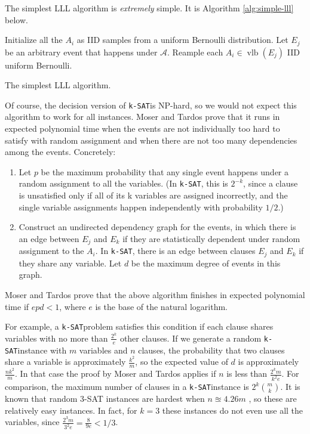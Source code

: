 \documentclass{article}
\newcommand{\ksat}{\texttt{k-SAT}}
\begin{document}
The simplest LLL algorithm is \emph{extremely} simple.  It is Algorithm \ref{alg:simple-lll} below.

\begin{algorithm}[H]
\label{alg:simple-lll}
\begin{algorithmic}
\State Initialize all the $A_i$ as IID samples from a uniform Bernoulli distribution.
  \State Let $E_j$ be an arbitrary event that happens under $\mathcal{A}$.
  \State Reample each $A_i \in \operatorname{vlb}(E_j)$ IID uniform Bernoulli.
\EndWhile
\end{algorithmic}
\caption{The simplest LLL algorithm.}
\end{algorithm}

Of course, the decision version of \ksat is NP-hard, so we would not expect this algorithm to work for all instances.  Moser and Tardos \cite{moser2010constructive} prove that it runs in expected polynomial time when the events are not individually too hard to satisfy with random assignment and when there are not too many dependencies among the events.  Concretely:
\begin{enumerate}
  \item Let $p$ be the maximum probability that any single event happens under a random assignment to all the variables.  (In \ksat, this is $2^{-k}$, since a clause is unsatisfied only if all of its k variables are assigned incorrectly, and the single variable assignments happen independently with probability $1/2$.)
  \item Construct an undirected dependency graph for the events, in which there is an edge between $E_j$ and $E_k$ if they are statistically dependent under random assignment to the $A_i$.  In \ksat, there is an edge between clauses $E_j$ and $E_k$ if they share any variable.  Let $d$ be the maximum degree of events in this graph.
\end{enumerate}
Moser and Tardos prove that the above algorithm finishes in expected polynomial time if $e p d < 1$, where $e$ is the base of the natural logarithm.

For example, a \ksat problem satisfies this condition if each clause shares variables with no more than $\frac{2^k}{e}$ other clauses.  If we generate a random \ksat instance with $m$ variables and $n$ clauses, the probability that two clauses share a variable is approximately $\frac{k^2}{m}$, so the expected value of $d$ is approximately $\frac{n k^2}{m}$.  In that case the proof by Moser and Tardos applies if $n$ is less than $\frac{2^k m}{k^2 e}$.  For comparison, the maximum number of clauses in a \ksat instance is $2^k {m \choose k}$.  It is known that random 3-SAT instances are hardest when $n \approxeq 4.26 m$ \cite{gomes2008satisfiability}, so these are relatively easy instances.  In fact, for $k = 3$ these instances do not even use all the variables, since $\frac{2^3 m}{3^2 e} = \frac{8}{9e} < 1/3$.
\end{document}
